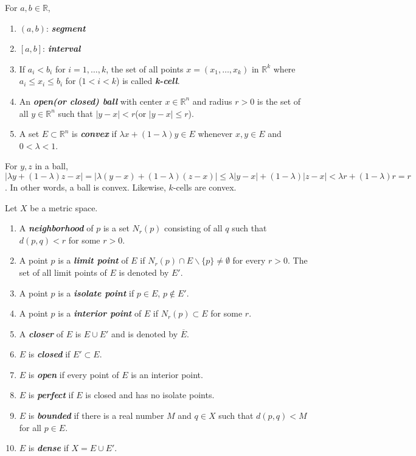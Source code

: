 \begin{definition}[pma 2.17]
For $a,b\in \mathbb{R}$,
\begin{enumerate}[label={(\arabic*)}]
\item $(a,b)$: \textbf{\emph{segment}}
\item $[a,b]$: \textbf{\emph{interval}}
\item If $a_i<b_i$ for $i=1,\dots,k$, the set of all points $x=(x_1,\dots,x_k)$ in $\mathbb{R}^k$ where $a_i\leq x_i\leq b_i$ for ($1<i<k$) is called \textbf{\emph{k-cell}}.
\item An \textbf{\emph{open(or closed) ball}} with center $x\in \mathbb{R}^n$ and radius $r>0$ is the set of all $y\in \mathbb{R}^n$ such that $|y-x|<r$(or $|y-x|\leq r$).
\item A set $E\subset \mathbb{R}^n$ is \textbf{\emph{convex}} if $\lambda x+(1-\lambda)y\in E$ whenever $x,y\in E$ and $0<\lambda<1$.
\end{enumerate}
\end{definition}

\begin{remark}[pma 2.17]
For $y,z$ in a ball, $|\lambda y + (1-\lambda)z - x| = |\lambda (y-x) +(1-\lambda)(z-x)| \leq \lambda|y-x|+(1-\lambda)|z-x| < \lambda r + (1-\lambda)r = r$. In other words, a ball is convex. Likewise, $k$-cells are convex.
\end{remark}

\begin{definition}[pma 2.18]
Let $X$ be a metric space.
\begin{enumerate}[label={(\arabic*)}]
\item A \textbf{\emph{neighborhood}} of $p$ is a set $N_r(p)$ consisting of all $q$ such that $d(p,q)<r$ for some $r>0$.
\item A point $p$ is a \textbf{\emph{limit point}} of $E$ if $N_r(p)\cap E\backslash\{p\}\neq \emptyset$ for every $r>0$. The set of all limit points of $E$ is denoted by $E'$.
\item A point $p$ is a \textbf{\emph{isolate point}} if $p\in E$, $p\notin E'$.
\item A point $p$ is a \textbf{\emph{interior point}} of $E$ if $N_r(p)\subset E$ for some $r$.
\item A \textbf{\emph{closer}} of $E$ is $E\cup E'$ and is denoted by $\overline{E}$.
\item $E$ is \textbf{\emph{closed}} if $E'\subset E$.
\item $E$ is \textbf{\emph{open}} if every point of $E$ is an interior point.
\item $E$ is \textbf{\emph{perfect}} if $E$ is closed and has no isolate points.
\item $E$ is \textbf{\emph{bounded}} if there is a real number $M$ and $q\in X$ such that $d(p,q)<M$ for all $p\in E$.
\item $E$ is \textbf{\emph{dense}} if $X=E\cup E'$.
\end{enumerate}
\end{definition}


